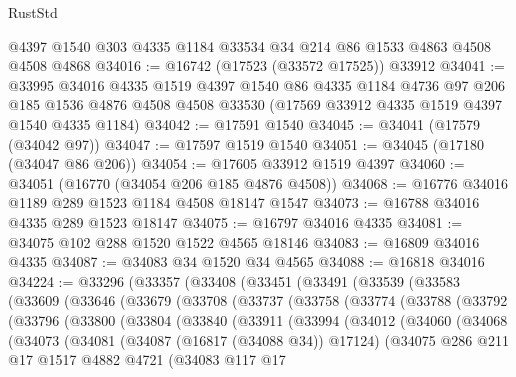 \begin{lexlean}{RustStd}
\begin{coremodule}
{\begin{coremodule}
{{{{{{{{{{{{{{{{{{{{{{{{{{{{{{{{{{{{{{{{{{{{{{{{{{{{{{{    @4397
    @1540
    @303
    @4335
    @1184
    @33534
    @34
    @214
    @86
    @1533
    @4863
    @4508
    @4508
    @4868
@34016 := @16742 (@17523 (@33572 @17525)) @33912
@34041 := @33995
    @34016
    @4335
    @1519
    @4397
    @1540
    @86
    @4335
    @1184
    @4736
    @97
    @206
    @185
    @1536
    @4876
    @4508
    @4508
    @33530
    (@17569 @33912 @4335 @1519 @4397 @1540 @4335 @1184)
@34042 := @17591 @1540
@34045 := @34041 (@17579 (@34042 @97))
@34047 := @17597 @1519 @1540
@34051 := @34045 (@17180 (@34047 @86 @206))
@34054 := @17605 @33912 @1519 @4397
@34060 := @34051 (@16770 (@34054 @206 @185 @4876 @4508))
@34068 := @16776 @34016 @1189 @289 @1523 @1184 @4508 @18147 @1547
@34073 := @16788 @34016 @4335 @289 @1523 @18147
@34075 := @16797 @34016 @4335
@34081 := @34075 @102 @288 @1520 @1522 @4565 @18146
@34083 := @16809 @34016 @4335
@34087 := @34083 @34 @1520 @34 @4565
@34088 := @16818 @34016
@34224 := @33296
    (@33357
      (@33408
        (@33451
          (@33491
            (@33539
              (@33583
                (@33609
                  (@33646
                    (@33679
                      (@33708
                        (@33737
                          (@33758
                            (@33774
                              (@33788
                                (@33792
                                  (@33796
                                    (@33800
                                      (@33804
                                        (@33840
                                          (@33911
                                            (@33994
                                              (@34012
                                                (@34060
                                                  (@34068
                                                    (@34073
                                                      (@34081
                                                        (@34087 (@16817 (@34088 @34)) @17124)
                                                        (@34075
                                                          @286
                                                          @211
                                                          @17
                                                          @1517
                                                          @4882
                                                          @4721
                                                          (@34083
                                                            @117
                                                            @17
}}}}}}}}}}}}}}}}}}}}}}}}}}}}}}}}}}}}}}}}}}}}}}}}}}}}}}}
\end{coremodule}}
\end{coremodule}
\end{lexlean}
